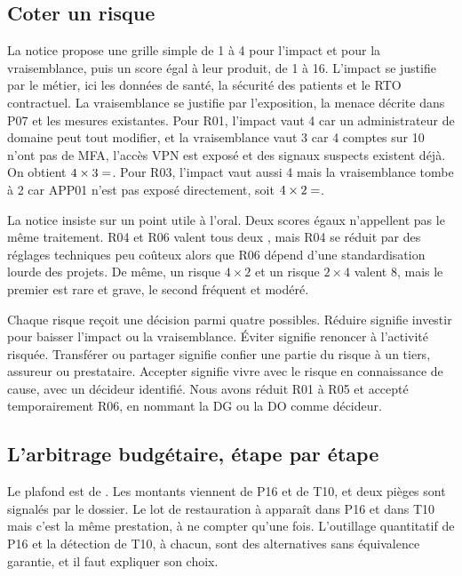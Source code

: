 \documentclass[11pt,a4paper]{article}
\begin{document}
\subsection{Coter un risque}

La notice propose une grille simple de 1 à 4 pour l'impact et pour la vraisemblance, puis un score égal à leur produit, de 1 à 16. L'impact se justifie par le métier, ici les données de santé, la sécurité des patients et le RTO contractuel. La vraisemblance se justifie par l'exposition, la menace décrite dans P07 et les mesures existantes. Pour R01, l'impact vaut 4 car un administrateur de domaine peut tout modifier, et la vraisemblance vaut 3 car 4 comptes sur 10 n'ont pas de MFA, l'accès VPN est exposé et des signaux suspects existent déjà. On obtient $4 \times 3 = \rscore{R01}$. Pour R03, l'impact vaut aussi 4 mais la vraisemblance tombe à 2 car APP01 n'est pas exposé directement, soit $4 \times 2 = \rscore{R03}$.

La notice insiste sur un point utile à l'oral. Deux scores égaux n'appellent pas le même traitement. R04 et R06 valent tous deux , mais R04 se réduit par des réglages techniques peu coûteux alors que R06 dépend d'une standardisation lourde des projets. De même, un risque $4 \times 2$ et un risque $2 \times 4$ valent 8, mais le premier est rare et grave, le second fréquent et modéré.

Chaque risque reçoit une décision parmi quatre possibles. Réduire signifie investir pour baisser l'impact ou la vraisemblance. Éviter signifie renoncer à l'activité risquée. Transférer ou partager signifie confier une partie du risque à un tiers, assureur ou prestataire. Accepter signifie vivre avec le risque en connaissance de cause, avec un décideur identifié. Nous avons réduit R01 à R05 et accepté temporairement R06, en nommant la DG ou la DO comme décideur.

\subsection{L'arbitrage budgétaire, étape par étape}

Le plafond est de \Plafond. Les montants viennent de P16 et de T10, et deux pièges sont signalés par le dossier. Le lot de restauration à  apparaît dans P16 et dans T10 mais c'est la même prestation, à ne compter qu'une fois. L'outillage quantitatif de P16 et la détection de T10, à  chacun, sont des alternatives sans équivalence garantie, et il faut expliquer son choix.
\end{document}
